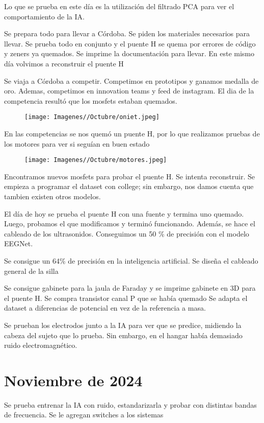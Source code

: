 \documentclass{article}
\begin{document}
Lo que se prueba en este día es la utilización del filtrado PCA para ver el comportamiento de la IA.

Se prepara todo para llevar a Córdoba. Se piden los materiales necesarios para llevar. Se prueba todo en conjunto y el puente H se quema por errores de código y zeners ya quemados. Se imprime la documentación para llevar. En este mismo día volvimos a reconstruir el puente H


\newpage

Se viaja a Córdoba a competir. Competimos en prototipos y ganamos medalla de oro. Ademas, competimos en innovation teams y feed de instagram. El dia de la competencia resultó que los mosfets estaban quemados.


\begin{figure}[H]
    \centering
    \texttt{[image: Imagenes//Octubre/oniet.jpeg]}
\end{figure}


En las competencias se nos quemó un puente H, por lo que realizamos pruebas de los motores para ver si seguían en buen estado

\begin{figure}[H]
    \centering
    \texttt{[image: Imagenes//Octubre/motores.jpeg]}
\end{figure}

\newpage

Encontramos nuevos mosfets para probar el puente H. Se intenta reconstruir. Se empieza a programar el dataset con college; sin embargo, nos damos cuenta que tambien existen otros modelos.


El día de hoy se prueba el puente H con una fuente y termina uno quemado. Luego, probamos el que modificamos y terminó funcionando. Además, se hace el cableado de los ultrasonidos. Conseguimos un 50 \% de precisión con el modelo EEGNet.

Se consigue un 64\% de precisión en la inteligencia artificial. Se diseña el cableado general de la silla

Se consigue gabinete para la jaula de Faraday y se imprime gabinete en 3D para el puente H. Se compra transistor canal P que se había quemado Se adapta el dataset a diferencias de potencial en vez de la referencia a masa.

Se prueban los electrodos junto a la IA para ver que se predice, midiendo la cabeza del sujeto que lo prueba. Sin embargo, en el hangar había demasiado ruido electromagnético.

\section{Noviembre de 2024}
Se prueba entrenar la IA con ruido, estandarizarla y probar con distintas bandas de frecuencia. Se le agregan switches a los sistemas
\end{document}
